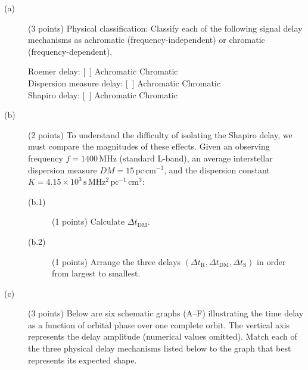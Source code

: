 \begin{description}
\item[(a)] (3 points) Physical classification: Classify each of the following
  signal delay mechanisms as achromatic (frequency-independent) or chromatic
  (frequency-dependent).

  Roemer delay: [\ ] Achromatic \quad [\ ] Chromatic\\
  Dispersion measure delay: [\ ] Achromatic \quad [\ ] Chromatic\\
  Shapiro delay: [\ ] Achromatic \quad [\ ] Chromatic
\item[(b)] (2 points) To understand the difficulty of isolating the Shapiro
  delay, we must compare the magnitudes of these effects. Given an observing
  frequency $f = 1400\,\mathrm{MHz}$ (standard L-band), an average
  interstellar dispersion measure $DM = 15\,\mathrm{pc\,cm^{-3}}$, and the
  dispersion constant
  $K = 4.15 \times 10^3\,\mathrm{s\,MHz^2\,pc^{-1}\,cm^3}$:
  \begin{description}
  \item[(b.1)] (1 points) Calculate $\Delta t_{\mathrm{DM}}$.
  \item[(b.2)] (1 points) Arrange the three delays
    $(\Delta t_{\mathrm{R}}, \Delta t_{\mathrm{DM}}, \Delta t_{\mathrm{S}})$
    in order from largest to smallest.
  \end{description}
\item[(c)] (3 points) Below are six schematic graphs (A--F) illustrating the
  time delay as a function of orbital phase over one complete orbit. The
  vertical axis represents the delay amplitude (numerical values omitted).
  Match each of the three physical delay mechanisms listed below to the graph
  that best represents its expected shape.



\end{description}
